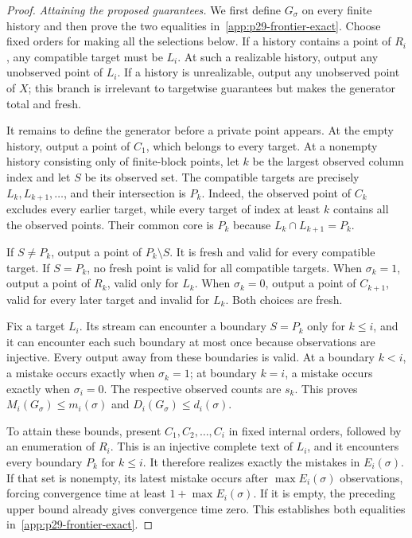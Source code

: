 \begin{proof}
\emph{Attaining the proposed guarantees.}
We first define $G_\sigma$ on every finite history and then prove the
two equalities in~\eqref{app:p29-frontier-exact}.
Choose fixed orders for making all the selections below. If a history
contains a point of $R_i$, any compatible target must be $L_i$.
At such a realizable history, output any unobserved point of $L_i$.
If a history is unrealizable, output any unobserved point of $X$;
this branch is irrelevant to targetwise guarantees but makes the
generator total and fresh.

It remains to define the generator before a private point appears.
At the empty history, output a point of $C_1$, which belongs to every
target. At a nonempty history consisting only of finite-block points,
let $k$ be the largest observed column index and let $S$ be its
observed set. The compatible targets are precisely
$L_k,L_{k+1},\ldots$, and their intersection is $P_k$. Indeed, the
observed point of $C_k$ excludes every earlier target, while every
target of index at least $k$ contains all the observed points. Their
common core is $P_k$ because $L_k\cap L_{k+1}=P_k$.

If $S\ne P_k$, output a point of $P_k\setminus S$. It is fresh and
valid for every compatible target. If $S=P_k$, no fresh point is valid
for all compatible targets. When $\sigma_k=1$, output a point of
$R_k$, valid only for $L_k$. When $\sigma_k=0$, output a point of
$C_{k+1}$, valid for every later target and invalid for $L_k$. Both
choices are fresh.

Fix a target $L_i$. Its stream can encounter a boundary $S=P_k$
only for $k\le i$, and it can encounter each such boundary at most
once because observations are injective. Every output away from
these boundaries is valid. At a boundary $k<i$, a mistake occurs
exactly when $\sigma_k=1$; at boundary $k=i$, a mistake occurs
exactly when $\sigma_i=0$. The respective observed counts are $s_k$.
This proves $M_i(G_\sigma)\le m_i(\sigma)$ and
$D_i(G_\sigma)\le d_i(\sigma)$.

To attain these bounds, present $C_1,C_2,\ldots,C_i$ in fixed
internal orders, followed by an enumeration of $R_i$. This is an
injective complete text of $L_i$, and it encounters every boundary
$P_k$ for $k\le i$. It therefore realizes exactly the mistakes in
$E_i(\sigma)$. If that set is nonempty, its latest mistake occurs
after $\max E_i(\sigma)$ observations, forcing convergence time at least
$1+\max E_i(\sigma)$. If it is empty, the preceding upper bound
already gives convergence time zero. This establishes both equalities
in~\eqref{app:p29-frontier-exact}.


\end{proof}
